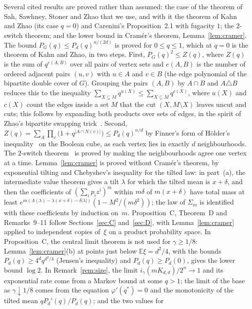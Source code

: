 \documentclass[11pt]{article}
\theoremstyle{remark}
\newcommand{\Ex}{\mathbb E}
\begin{document}
Several cited results are proved rather than assumed: the case of the
theorem of Sah, Sawhney, Stoner and Zhao that we use, and with it the theorem
of Kahn and Zhao (its case $q=0$) and Carenini's Proposition~2.1 with
fugacity $1$; the $2$-switch theorem; and the lower bound in Cramér's
theorem, Lemma~\ref{lem:cramer}. The bound
$P_G(q)\le P_d(q)^{n/(2d)}$ is proved for $0\le q\le1$, which at $q=0$ is the
theorem of Kahn and Zhao, in two steps. First, $P_G(q)^2\le Z(q)$, where
$Z(q)$ is the sum of $q^{e(A,B)}$ over all pairs of vertex sets and $e(A,B)$ is
the number of ordered adjacent pairs $(u,v)$ with $u\in A$ and $v\in B$ (the
edge polynomial of the bipartite double cover of $G$). Grouping the pairs
$(A,B)$ by $A\cap B$ and $A\triangle B$ reduces this to the inequality
$\sum_{X\subseteq M}q^{u(X)}\le\sum_{X\subseteq M}q^{c(X)}$, where $u(X)$ and
$c(X)$ count the edges inside a set $M$ that the cut $(X,M\setminus X)$ leaves
uncut and cuts; this follows by expanding both products over sets of edges,
in the spirit of Zhao's bipartite swapping trick~\cite{zhao}. Second,
$Z(q)=\sum_A\prod_v\bigl(1+q^{|A\cap N(v)|}\bigr)\le P_d(q)^{n/d}$ by Finner's
form of Hölder's inequality~\cite{finner} on the Boolean cube, as each vertex lies in
exactly $d$ neighbourhoods. The $2$-switch theorem~\cite{hakimi,fhm} is proved
by making the neighbourhoods agree one vertex at a time. Lemma~\ref{lem:cramer}
is proved without Cramér's theorem, by exponential tilting and Chebyshev's
inequality for the tilted law: in part~(a), the intermediate value theorem gives
a tilt $\lambda$ for which the tilted mean is $x+\delta$, and then the coefficients of
$(\sum_ip_iz^i)^m$ within $m\delta$ of $m(x+\delta)$ have total mass at least
$e^{m(\Lambda(\lambda)-\lambda(x+\delta)-\delta|\lambda|)}(1-M^2/(m\delta^2))$;
the law of $\Sigma_m$ is identified with these coefficients by induction
on~$m$. Proposition~C, Theorem~D and Remarks~9--11 follow Sections~\ref{sec:C}
and~\ref{sec:D}, with Lemma~\ref{lem:cramer} applied to independent copies
of~$\xi$ on a product probability space. In Proposition~C, the central limit
theorem is not used for $\gamma\ge1/8$: Lemma~\ref{lem:cramer}(b) at points
just below $\Ex\xi=d^2/4$, with the bounds $P_d(q)\ge4^dq^{d^2/4}$ (Jensen's
inequality) and $P_d(q)\ge P_d(0)$, gives the lower bound $\log2$. In
Remark~\ref{rem:size}, the limit $i_\gamma(mK_{d,d})/2^n\to1$ and its
exponential rate come from a Markov bound at some $q>1$; the limit of the
base as $\gamma\downarrow1/8$ comes from the equation $\varphi'(q^*)=0$ and
the monotonicity of the tilted mean $qP_d'(q)/P_d(q)$; and the two values for
\end{document}
